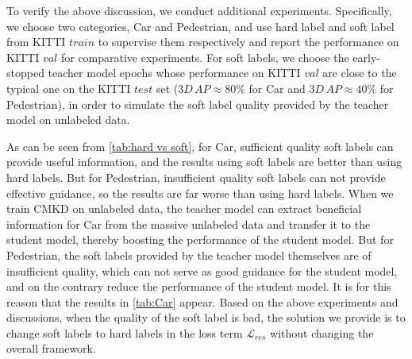 \documentclass[runningheads]{llncs}
\begin{document}
\begin{table}[t]
    \centering
    \small
    \caption{Comparison between hard labels and soft labels used in $\mathcal{L}_{res}$.
    Among them, the soft labels for Car are of sufficient quality, and the soft labels for Pedestrian are of insufficient quality. 
    We choose the early-stopped teacher model epochs to simulate the soft label quality that can be provided on unlabeled data.}
    \label{tab:hard vs soft}
\end{table}

To verify the above discussion, we conduct additional experiments.
Specifically, we choose two categories, Car and Pedestrian, and use hard label and soft label from KITTI $train$ to supervise them respectively and report the performance on KITTI $val$ for comparative experiments.
For soft labels, we choose the early-stopped teacher model epochs whose performance on KITTI $val$ are close to the typical one on the KITTI $test$ set ($3D\,AP\approx 80\%$ for Car and $3D\,AP\approx 40\%$ for Pedestrian), in order to simulate the soft label quality provided by the teacher model on unlabeled data.

As can be seen from \cref{tab:hard vs soft}, for Car, sufficient quality soft labels can provide useful information, and the results using soft labels are better than using hard labels.
But for Pedestrian, insufficient quality soft labels can not provide effective guidance, so the results are far worse than using hard labels.
When we train CMKD on unlabeled data, the teacher model can extract beneficial information for Car from the massive unlabeled data and transfer it to the student model, thereby boosting the performance of the student model.
But for Pedestrian, the soft labels provided by the teacher model themselves are of insufficient quality, which can not serve as good guidance for the student model, and on the contrary reduce the performance of the student model. 
It is for this reason that the results in \cref{tab:Car} appear.
Based on the above experiments and discussions, when the quality of the soft label is bad, the solution we provide is to change soft labels to hard labels in the loss term $\mathcal{L}_{res}$ without changing the overall framework.
\end{document}
